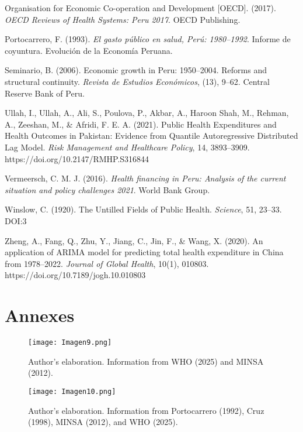 \documentclass[12pt]{article}
\begin{document}
Organisation for Economic Co-operation and Development [OECD]. (2017). \textit{OECD Reviews of Health Systems: Peru 2017}. OECD Publishing.

Portocarrero, F. (1993). \textit{El gasto público en salud, Perú: 1980–1992}. Informe de coyuntura. Evolución de la Economía Peruana.

Seminario, B. (2006). Economic growth in Peru: 1950–2004. Reforms and structural continuity. \textit{Revista de Estudios Económicos}, (13), 9–62. Central Reserve Bank of Peru.

Ullah, I., Ullah, A., Ali, S., Poulova, P., Akbar, A., Haroon Shah, M., Rehman, A., Zeeshan, M., \& Afridi, F. E. A. (2021). Public Health Expenditures and Health Outcomes in Pakistan: Evidence from Quantile Autoregressive Distributed Lag Model. \textit{Risk Management and Healthcare Policy}, 14, 3893–3909. https://doi.org/10.2147/RMHP.S316844

Vermeersch, C. M. J. (2016). \textit{Health financing in Peru: Analysis of the current situation and policy challenges 2021}. World Bank Group.

Winslow, C. (1920). The Untilled Fields of Public Health. \textit{Science}, 51, 23–33. DOI:3

Zheng, A., Fang, Q., Zhu, Y., Jiang, C., Jin, F., \& Wang, X. (2020). An application of ARIMA model for predicting total health expenditure in China from 1978–2022. \textit{Journal of Global Health}, 10(1), 010803. https://doi.org/10.7189/jogh.10.010803

\section{Annexes}

\begin{figure}[H]
\par\vspace{0.8em}
\texttt{[image: Imagen9.png]}

{\footnotesize Author’s elaboration. Information from WHO (2025) and MINSA (2012).}
\end{figure}

\begin{figure}[H]
\par\vspace{0.8em}
\texttt{[image: Imagen10.png]}

{\footnotesize Author’s elaboration. Information from Portocarrero (1992), Cruz (1998), MINSA (2012), and WHO (2025).}
\end{figure}
\end{document}
